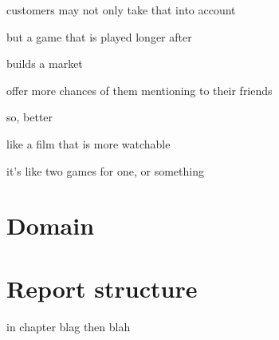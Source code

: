 customers may not only take that into account

but a game that is played longer after

builds a market

offer more chances of them mentioning to their friends

so, better

like a film that is more watchable

it's like two games for one, or something

\section{Domain}

\section{Report structure}


in chapter blag then blah